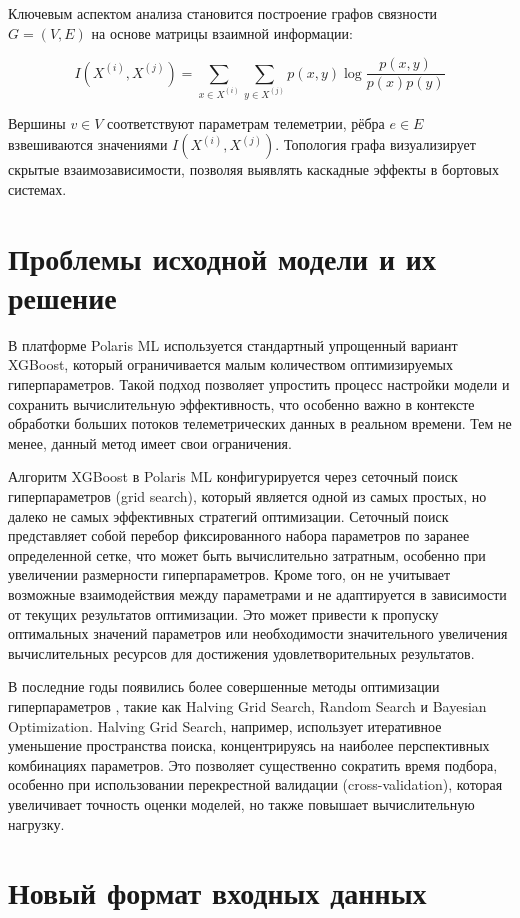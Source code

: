 Ключевым аспектом анализа становится построение графов связности $G=(V,E)$ на
основе матрицы взаимной информации:

\[
	I(X^{(i)}, X^{(j)}) = \sum_{x \in X^{(i)}} \sum_{y \in X^{(j)}} p(x,y) \log \frac{p(x,y)}{p(x)p(y)}
\]

Вершины $v \in V$ соответствуют параметрам телеметрии, рёбра $e \in E$
взвешиваются значениями $I(X^{(i)}, X^{(j)})$. Топология графа визуализирует
скрытые взаимозависимости, позволяя выявлять каскадные эффекты в бортовых
системах.

\section{Проблемы исходной модели и их решение}

В платформе Polaris ML используется стандартный упрощенный вариант XGBoost, который ограничивается малым количеством оптимизируемых гиперпараметров. Такой подход позволяет упростить процесс настройки модели и сохранить вычислительную эффективность, что особенно важно в контексте обработки больших потоков телеметрических данных в реальном времени. Тем не менее, данный метод имеет свои ограничения.

Алгоритм XGBoost в Polaris ML конфигурируется через сеточный поиск гиперпараметров (grid search), который является одной из самых простых, но далеко не самых эффективных стратегий оптимизации. Сеточный поиск представляет собой перебор фиксированного набора параметров по заранее определенной сетке, что может быть вычислительно затратным, особенно при увеличении размерности гиперпараметров. Кроме того, он не учитывает возможные взаимодействия между параметрами и не адаптируется в зависимости от текущих результатов оптимизации. Это может привести к пропуску оптимальных значений параметров или необходимости значительного увеличения вычислительных ресурсов для достижения удовлетворительных результатов.

В последние годы появились более совершенные методы оптимизации гиперпараметров \cite{grid_search_tuning}, такие как Halving Grid Search, Random Search и Bayesian Optimization. Halving Grid Search, например, использует итеративное уменьшение пространства поиска, концентрируясь на наиболее перспективных комбинациях параметров. Это позволяет существенно сократить время подбора, особенно при использовании перекрестной валидации (cross-validation), которая увеличивает точность оценки моделей, но также повышает вычислительную нагрузку.

\section{Новый формат входных данных}

